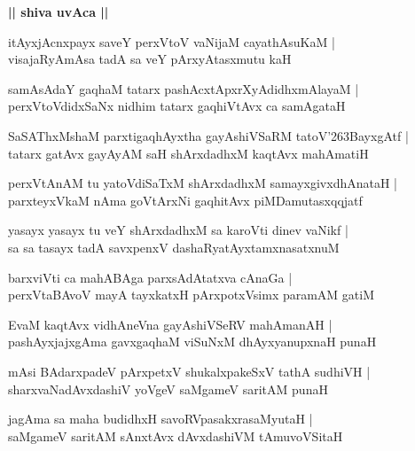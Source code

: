 \documentclass[twoside,12pt,openright]{book}
\def\S{\char'263}
\newcounter{shloka}[chapter]
\def\uvaca#1{\centerline{{\large\textbf{#1}}}}
\begin{document}
\uvaca{|| shiva uvAca ||}

\begin{shloka}%
itAyxjAcnxpayx saveY perxVtoV vaNijaM cayathAsuKaM |\\
visajaRyAmAsa tadA sa veY pArxyAtasxmutu kaH 
\end{shloka}

\begin{shloka}%
samAsAdaY gaqhaM tatarx pashAcxtApxrXyAdidhxmAlayaM |\\
perxVtoVdidxSaNx nidhim tatarx gaqhiVtAvx ca samAgataH 
\end{shloka}

\begin{shloka}%
SaSAThxMshaM parxtigaqhAyxtha gayAshiVSaRM tatoV\S BayxgAtf |\\
tatarx gatAvx gayAyAM saH shArxdadhxM kaqtAvx mahAmatiH 
\end{shloka}

\begin{shloka}%
perxVtAnAM tu yatoVdiSaTxM shArxdadhxM samayxgivxdhAnataH |\\
parxteyxVkaM nAma goVtArxNi gaqhitAvx piMDamutasxqqjatf
\end{shloka}

\begin{shloka}%
yasayx yasayx tu veY shArxdadhxM sa karoVti dinev vaNikf |\\
sa sa tasayx tadA savxpenxV dashaRyatAyxtamxnasatxnuM
\end{shloka}

\begin{shloka}%
barxviVti ca mahABAga parxsAdAtatxva cAnaGa |\\
perxVtaBAvoV mayA tayxkatxH pArxpotxVsimx paramAM gatiM 
\end{shloka}

\begin{shloka}%
EvaM kaqtAvx vidhAneVna gayAshiVSeRV mahAmanAH |\\
pashAyxjajxgAma gavxgaqhaM viSuNxM dhAyxyanupxnaH punaH 
\end{shloka}

\begin{shloka}%
mAsi BAdarxpadeV pArxpetxV shukalxpakeSxV tathA sudhiVH |\\
sharxvaNadAvxdashiV yoVgeV saMgameV saritAM punaH 
\end{shloka}

\begin{shloka}%
jagAma sa maha budidhxH savoRVpasakxrasaMyutaH |\\
saMgameV saritAM sAnxtAvx dAvxdashiVM tAmuvoVSitaH 
\end{shloka}
\end{document}
